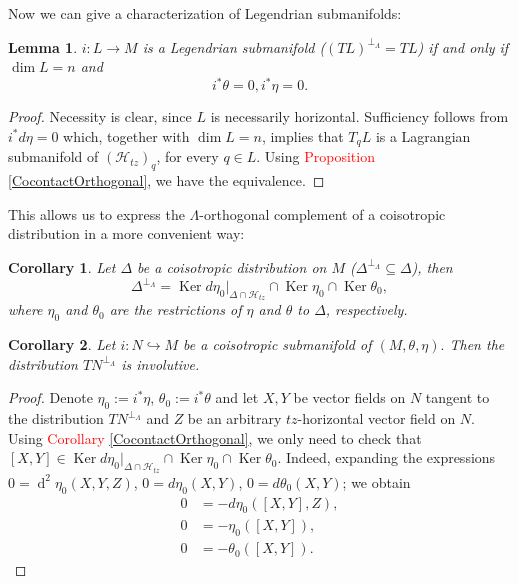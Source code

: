 \documentclass[12pt]{article}
\newtheorem{lemma}{Lemma}[section]
\newtheorem{corollary}{Corollary}[section]
\renewcommand{\dim}{\operatorname{dim}}
\renewcommand{\ker}{\operatorname{Ker}}
\renewcommand{\d}{\operatorname{d}}
\begin{document}
Now we can give a characterization of Legendrian submanifolds:
\begin{lemma} \label{ClassificationLegendrianCocontact} $i:L \rightarrow M$ is a Legendrian submanifold ($(TL)^{\perp_\Lambda} = TL$) if and only if $\dim L = n$ and $$i^*\theta = 0, i^*\eta = 0.$$
\end{lemma}
\begin{proof}Necessity is clear, since $L$ is necessarily horizontal. Sufficiency follows from $i^* d\eta = 0$ which, together with $\dim L = n$,  implies that $T_qL$ is a Lagrangian submanifold of $(\mathcal{H}_{tz})_q$, for every $q\in L$. Using \textcolor{red}{Proposition \ref{CocontactOrthogonal}}, we have the equivalence.
\end{proof}

This allows us to express the $\Lambda$-orthogonal complement of a coisotropic distribution in a more convenient way:\\
\begin{corollary} Let $\Delta$ be a coisotropic distribution on $M$ ($\Delta^{\perp_\Lambda}\subseteq \Delta$), then $$\Delta^{\perp_\Lambda} = \ker d\eta_0|_{\Delta \cap \mathcal{H}_{tz}} \cap \ker \eta_0 \cap \ker \theta_0,$$ where $\eta_0$ and $\theta_0$ are the restrictions of $\eta$ and $\theta$ to $\Delta$, respectively.\\
\end{corollary}

\begin{corollary}\label{CocontactOrthogonalCorollary} Let $i: N \hookrightarrow M$ be a coisotropic submanifold of $(M,\theta, \eta).$ Then the distribution $TN^{\perp_\Lambda}$ is involutive.
\end{corollary}
\begin{proof} Denote $\eta_0 := i^*\eta$, $\theta_0 := i^*\theta$ and let $X,Y$ be vector fields on $N$ tangent to the distribution $TN^{\perp_\Lambda}$ and $Z$ be an arbitrary $tz$-horizontal vector field on $N$. Using \textcolor{red}{Corollary \ref{CocontactOrthogonal}}, we only need to check that $[X,Y] \in \ker d\eta_0|_{\Delta \cap \mathcal{H}_{tz}} \cap \ker \eta_0 \cap \ker \theta_0.$ Indeed, expanding the expressions $0 = \d^2 \eta_0(X,Y,Z)$, $0 =  d\eta_0(X,Y)$, $0 = d\theta_0(X,Y)$; we obtain 
\begin{align*}
0 &= - d\eta_0([X,Y], Z), \\
0 &= - \eta_0([X,Y]), \\
0 &= - \theta_0([X,Y]).
\end{align*}
\end{proof}
\end{document}
